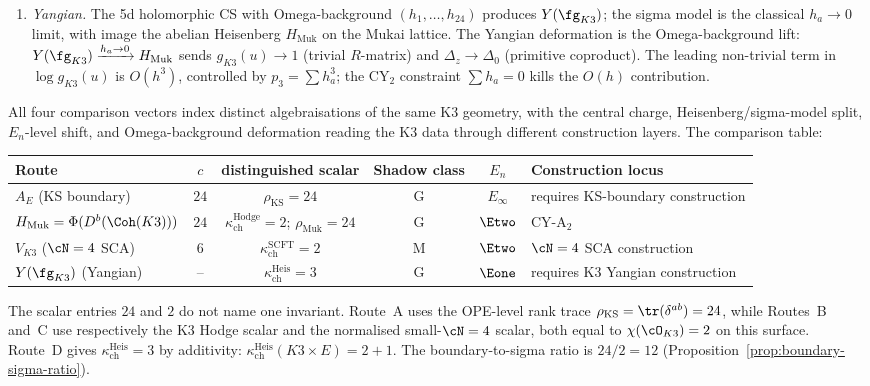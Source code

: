 \begin{proposition}
\begin{enumerate}[label=\textup{(\roman*)}]
 \item \emph{Yangian.} The 5d holomorphic CS with Omega-background $(h_1, \ldots, h_{24})$ produces $Y(\fg_{K3})$; the sigma model is the classical $h_a \to 0$ limit, with image the abelian Heisenberg $H_{\mathrm{Muk}}$ on the Mukai lattice. The Yangian deformation is the Omega-background lift: $Y(\fg_{K3}) \xrightarrow{h_a \to 0} H_{\mathrm{Muk}}$ sends $g_{K3}(u) \to 1$ (trivial $R$-matrix) and $\Delta_z \to \Delta_0$ (primitive coproduct). The leading non-trivial term in $\log g_{K3}(u)$ is $O(h^3)$, controlled by $p_3 = \sum h_a^3$; the CY$_2$ constraint $\sum h_a = 0$ kills the $O(h)$ contribution.
\end{enumerate}
All four comparison vectors index distinct algebraisations of the same K3 geometry, with the central charge, Heisenberg/sigma-model split, $E_n$-level shift, and Omega-background deformation reading the K3 data through different construction layers. The comparison table:
\begin{center}
\small
\renewcommand{\arraystretch}{1.3}
\begin{tabular}{lccccl}
\toprule
\textbf{Route} & $c$ & \textbf{distinguished scalar} & \textbf{Shadow class} & $E_n$ & \textbf{Construction locus} \\
\midrule
$A_E$ (KS boundary) & $24$ & $\rho_{\mathrm{KS}}=24$ & G & $E_\infty$ & requires KS-boundary construction \\
$H_{\mathrm{Muk}} = \Phi(D^b(\Coh(K3)))$ & $24$ & $\kappa_{\mathrm{ch}}^{\mathrm{Hodge}}=2$; $\rho_{\mathrm{Muk}}=24$ & G & $\Etwo$ & CY-A$_2$ \\
$V_{K3}$ ($\cN = 4$ SCA) & $6$ & $\kappa_{\mathrm{ch}}^{\mathrm{SCFT}}=2$ & M & $\Etwo$ & $\cN=4$ SCA construction \\
$Y(\fg_{K3})$ (Yangian) & -- & $\kappa_{\mathrm{ch}}^{\mathrm{Heis}}=3$ & G & $\Eone$ & requires K3 Yangian construction \\
\bottomrule
\end{tabular}
\end{center}
The scalar entries $24$ and $2$ do not name one invariant. Route~A uses the OPE-level rank trace $\rho_{\mathrm{KS}}=\tr(\delta^{ab}) = 24$, while Routes~B and~C use respectively the K3 Hodge scalar and the normalised small-$\cN=4$ scalar, both equal to $\chi(\cO_{K3}) = 2$ on this surface. Route~D gives $\kappa_{\mathrm{ch}}^{\mathrm{Heis}} = 3$ by additivity: $\kappa_{\mathrm{ch}}^{\mathrm{Heis}}(K3 \times E) = 2 + 1$. The boundary-to-sigma ratio is $24/2 = 12$ (Proposition~\textup{\ref{prop:boundary-sigma-ratio}}).

\end{proposition}

